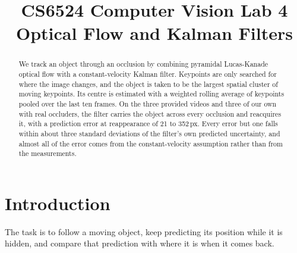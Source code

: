 \documentclass[conference]{assets/latex/IEEEtran}
\begin{document}
\title{CS6524 Computer Vision Lab 4\\ Optical Flow and Kalman Filters}

\author{
\and
{}
\and
{}
}

\maketitle

\begin{abstract}
We track an object through an occlusion by combining pyramidal Lucas-Kanade optical flow with a constant-velocity Kalman filter. Keypoints are only searched for where the image changes, and the object is taken to be the largest spatial cluster of moving keypoints. Its centre is estimated with a weighted rolling average of keypoints pooled over the last ten frames. On the three provided videos and three of our own with real occluders, the filter carries the object across every occlusion and reacquires it, with a prediction error at reappearance of 21 to 352\,px. Every error but one falls within about three standard deviations of the filter's own predicted uncertainty, and almost all of the error comes from the constant-velocity assumption rather than from the measurements.
\end{abstract}

\section{Introduction}

The task is to follow a moving object, keep predicting its position while it is hidden, and compare that prediction with where it is when it comes back.
\end{document}
